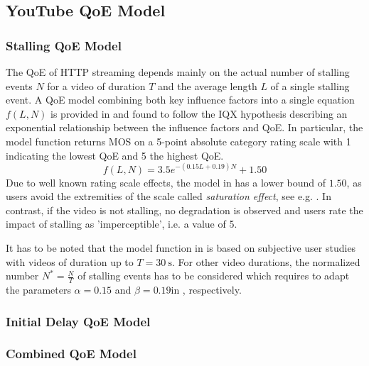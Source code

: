\subsection{YouTube QoE Model}\label{sec:application:qoe_user_behaviour:typical_user_scenarios:youtube_qoe}
\subsubsection*{Stalling QoE Model}\label{sec:application:qoe_user_behaviour:typical_user_scenarios:youtube_qoe:stalling}
The \gls{QoE} of \gls{HTTP} streaming depends mainly on the actual number of stalling events \(N\) for a video of duration \(T\) and the average length \(L\) of a single stalling event.
A \gls{QoE} model combining both key influence factors into a single equation \(f(L,N)\) is provided in \cite{Hossfeld2013c} and found to follow the IQX hypothesis \cite{Fiedler2010} describing an exponential relationship between the influence factors and \gls{QoE}.
In particular, the model function returns \gls{MOS} on a 5-point absolute category rating scale with 1 indicating the lowest \gls{QoE} and 5 the highest \gls{QoE}. 
\begin{equation}
 f(L,N) = 3.5 e^{-(0.15L + 0.19)N}+1.50
\label{eq:application:qoe_user_behaviour:typical_user_scenarios:youtube_qoe:stalling:original_model}
\end{equation}
Due to well known rating scale effects, the model in  has a lower bound of \(1.50\), as users avoid the extremities of the scale called \emph{saturation effect}, see e.g. \cite{Moller2000}.
In contrast, if the video is not stalling, no degradation is observed and users rate the impact of stalling as 'imperceptible', i.e. a value of 5.

It has to be noted that the model function in  is based on subjective user studies with videos of duration up to \(T=\SI{30}{\second}\).
For other video durations, the normalized number \(N^*=\frac{N}{T}\) of stalling events has to be considered which requires to adapt the parameters \(\alpha=0.15\) and \(\beta=0.19\)in , respectively. 

\subsubsection*{Initial Delay QoE Model}\label{sec:application:qoe_user_behaviour:typical_user_scenarios:initial_delay}
\subsubsection*{Combined QoE Model}\label{sec:application:qoe_user_behaviour:typical_user_scenarios:youtube_qoe:combined}

